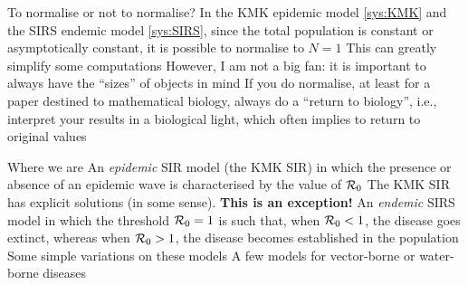 \documentclass[aspectratio=169]{beamer}\usepackage[]{graphicx}\usepackage[]{xcolor}
\makeatletter
\newcommand{\hlnum}[1]{\textcolor[rgb]{0.686,0.059,0.569}{#1}}%
\newcommand{\hlsng}[1]{\textcolor[rgb]{0.192,0.494,0.8}{#1}}%
\newcommand{\hlcom}[1]{\textcolor[rgb]{0.678,0.584,0.686}{\textit{#1}}}%
\newcommand{\hlopt}[1]{\textcolor[rgb]{0,0,0}{#1}}%
\newcommand{\hldef}[1]{\textcolor[rgb]{0.345,0.345,0.345}{#1}}%
\newcommand{\hlkwa}[1]{\textcolor[rgb]{0.161,0.373,0.58}{\textbf{#1}}}%
\newcommand{\hlkwb}[1]{\textcolor[rgb]{0.69,0.353,0.396}{#1}}%
\newcommand{\hlkwc}[1]{\textcolor[rgb]{0.333,0.667,0.333}{#1}}%
\newcommand{\hlkwd}[1]{\textcolor[rgb]{0.737,0.353,0.396}{\textbf{#1}}}%
\newenvironment{kframe}{%
 \def\at@end@of@kframe{}%
 \ifinner\ifhmode%
  \def\at@end@of@kframe{\end{minipage}}%
  \begin{minipage}{\columnwidth}%
 \fi\fi%
 \def\FrameCommand##1{\hskip\@totalleftmargin \hskip-\fboxsep
 \colorbox{shadecolor}{##1}\hskip-\fboxsep
     \hskip-\linewidth \hskip-\@totalleftmargin \hskip\columnwidth}%
 \MakeFramed {\advance\hsize-\width
   \@totalleftmargin\z@ \linewidth\hsize
   \@setminipage}}%
 {\par\unskip\endMakeFramed%
 \at@end@of@kframe}
\newenvironment{knitrout}{}{} %
\makeatother
\begin{document}
\begin{frame}{To normalise or not to normalise?}
\bbullet In the KMK epidemic model \eqref{sys:KMK} and the SIRS endemic model \eqref{sys:SIRS}, since the total population is constant or asymptotically constant, it is possible to normalise to $N=1$
\vfill
\bbullet This can greatly simplify some computations
\vfill
\bbullet However, I am not a big fan: it is important to always have the ``sizes'' of objects in mind
\vfill
\bbullet If you do normalise, at least for a paper destined to mathematical biology, always do a ``return to biology'', i.e., interpret your results in a biological light, which often implies to return to original values
\end{frame}

\begin{frame}{Where we are}
\bbullet An \emph{epidemic} SIR model (the KMK SIR) in which the presence or absence of an epidemic wave is characterised by the value of $\mathcal{R}_0$
\vfill
\bbullet The KMK SIR has explicit solutions (in some sense). \textbf{This is an exception!}
\vfill
\bbullet An \emph{endemic} SIRS model in which the threshold $\mathcal{R}_0=1$ is such that, when $\mathcal{R}_0<1$, the disease goes extinct, whereas when $\mathcal{R}_0>1$, the disease becomes established in the population
\vfill
\bbullet Some simple variations on these models
\vfill
\bbullet A few models for vector-borne or water-borne diseases
\end{frame}

\end{document}
